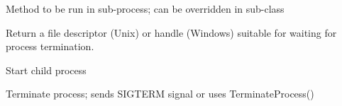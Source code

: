 \documentclass[letterpaper,10pt,english]{sphinxmanual}
\begin{document}
\begin{fulllineitems}
\begin{fulllineitems}
\end{fulllineitems}


\begin{fulllineitems}
\label{\detokenize{mongoDB_data_ingestion:ingest_raw.Timer.run}}
Method to be run in sub-process; can be overridden in sub-class

\end{fulllineitems}


\begin{fulllineitems}
\label{\detokenize{mongoDB_data_ingestion:ingest_raw.Timer.sentinel}}
Return a file descriptor (Unix) or handle (Windows) suitable for
waiting for process termination.

\end{fulllineitems}


\begin{fulllineitems}
\label{\detokenize{mongoDB_data_ingestion:ingest_raw.Timer.start}}
Start child process

\end{fulllineitems}


\begin{fulllineitems}
\label{\detokenize{mongoDB_data_ingestion:ingest_raw.Timer.terminate}}
Terminate process; sends SIGTERM signal or uses TerminateProcess()

\end{fulllineitems}


\end{fulllineitems}


\begin{fulllineitems}
\label{\detokenize{mongoDB_data_ingestion:ingest_raw.calculate_sentiment}}
\end{fulllineitems}
\end{document}
